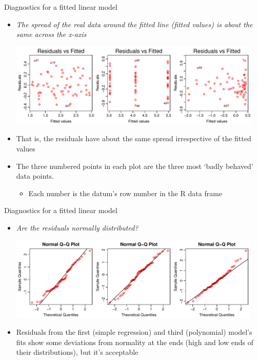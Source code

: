 \documentclass[xcolor=x11names,handout,compress]{beamer}
\renewcommand{\(}{\begin{columns}}
\renewcommand{\)}{\end{columns}}
\newcommand{\<}[1]{\begin{column}{#1}}
\renewcommand{\>}{\end{column}}
\begin{document}
\begin{frame}{Diagnostics for a fitted linear model}
        
\begin{itemize}[<+->]\itemsep6pt
    \item \it The spread of the real data around the fitted line (fitted values) is about the same across the x-axis\\ \pause
    
    \includegraphics[width=0.95\textwidth]{FitResid.pdf}

    \pause 
    \item That is, the residuals have about the same spread irrespective of the fitted values 
    \item The three numbered points in each plot are the three most `badly behaved' data points.
    \begin{itemize}
        \item Each number is the datum's row number in the R data frame 
    \end{itemize}
\end{itemize}

\end{frame}


\begin{frame}{Diagnostics for a fitted linear model}

\begin{itemize}[<+->]\itemsep6pt
    \item \it Are the residuals normally distributed?\\ \pause

    \includegraphics[width=0.95\textwidth]{QQNorm.pdf}

    \pause 
    \item Residuals from the first (simple regression) and third (polynomial) model's fits show some deviations from normality at the ends (high and low ends of their distributions), but it's acceptable
    \end{itemize}

\end{frame}
    
\end{document}
